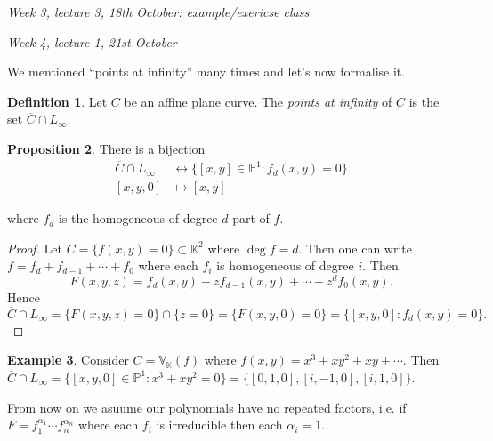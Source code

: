 \documentclass{article}
\newcommand{\K}{\mathbb{K}}
\newcommand{\V}{\mathbb{V}}
\newcommand{\p}{\mathbb{P}}
\theoremstyle{definition}
\newtheorem{defn}{Definition}[subsection]
\newtheorem{prop}[defn]{Proposition}
\newtheorem{example}[defn]{Example}
\begin{document}
\begin{flushright}
\textit{Week 3, lecture 3, 18th October: example/exericse class}
\end{flushright}

\begin{flushright}
\textit{Week 4, lecture 1, 21st October}
\end{flushright}

We mentioned ``points at infinity'' many times and let's now formalise it.
\begin{defn}
Let $C$ be an affine plane curve. The \textit{points at infinity} of $C$ is the set $\overline C\cap L_\infty$.
\end{defn}

\begin{prop}
There is a bijection
\[
\begin{aligned}
\overline C\cap L_\infty &\leftrightarrow \{[x,y]\in\p^1:f_d(x,y)=0\} \\
[x,y,0]&\mapsto [x,y]
\end{aligned}
\]
\end{prop}
where $f_d$ is the homogeneous of degree $d$ part of $f$.
\begin{proof}
Let $C=\{f(x,y)=0\}\subset\K^2$ where $\deg f=d$. Then one can write $f=f_d+f_{d-1}+\cdots+f_0$ where each $f_i$ is homogeneous of degree $i$. Then
\[
F(x,y,z)=f_d(x,y)+zf_{d-1}(x,y)+\cdots+z^df_0(x,y).
\]
Hence
\[
\overline C\cap L_\infty=\{F(x,y,z)=0\}\cap\{z=0\}=\{F(x,y,0)=0\}=\{[x,y,0]:f_d(x,y)=0\}.
\]
\end{proof}
\begin{example}
Consider $C=\V_\K(f)$ where $f(x,y)=x^3+xy^2+xy+\cdots$. Then $\overline C\cap L_\infty=\{[x,y,0]\in\p^1:x^3+xy^2=0\}=\{[0,1,0],[i,-1,0],[i,1,0]\}$.
\end{example}

From now on we asuume our polynomials have no repeated factors, i.e. if $F=f_1^{\alpha_1}\cdots f_n^{\alpha_n}$ where each $f_i$ is irreducible then each $\alpha_i=1$.
\end{document}
